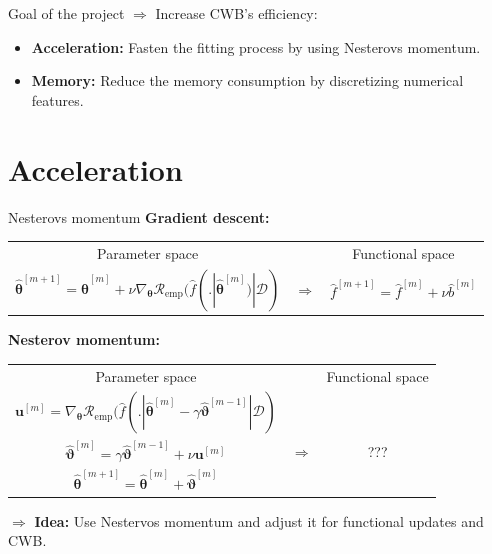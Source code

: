 \documentclass[ignorenonframetext,]{beamer}
\providecommand{\tightlist}{%
  \setlength{\itemsep}{0pt}\setlength{\parskip}{0pt}}
\newcommand{\D}{\mathcal{D}}
\newcommand{\fh}{\hat{f}}
\newcommand{\fmh}{\fh^{[m]}}
\newcommand{\tb}{\bm{\theta}}
\newcommand{\tbh}{\hat{\bm{\theta}}}
\newcommand{\riske}{\mathcal{R}_{\text{emp}}}
\begin{document}
\begin{frame}{Goal of the project}
\protect\hypertarget{goal-of-the-project}{}
\(\Rightarrow\) Increase CWB's efficiency:

\begin{itemize}
\tightlist
\item
  \textbf{Acceleration:} Fasten the fitting process by using Nesterovs
  momentum.
\item
  \textbf{Memory:} Reduce the memory consumption by discretizing
  numerical features.
\end{itemize}
\end{frame}

\hypertarget{acceleration}{%
\section{Acceleration}\label{acceleration}}

\begin{frame}{Nesterovs momentum}
\protect\hypertarget{nesterovs-momentum}{}
\textbf{Gradient descent:}

\vspace{0.2cm}
{\small
\begin{tabular}{ccc}
  Parameter space & & Functional space \\[0.3cm]
  $\tbh^{[m+1]} = \tbh^{[m]} + \nu \nabla_{\tb}\riske(\fh(. | \tbh^{[m]}) | \D)$ & $\Rightarrow$ & $\fh^{[m+1]} = \fmh + \nu \hat{b}^{[m]}$
\end{tabular}}
\vspace{0.2cm}

\textbf{Nesterov momentum:}

\vspace{0.2cm}
{\small
\begin{tabular}{ccc}
  Parameter space & & Functional space \\[0.3cm]
  $\bm{u}^{[m]} = \nabla_{\tb}\riske(\fh(. | \tbh^{[m]} - \gamma \hat{\bm{\vartheta}}^{[m-1]} | \D)$ &  & \\
  $\hat{\bm{\vartheta}}^{[m]} = \gamma \hat{\bm{\vartheta}}^{[m-1]} + \nu \bm{u}^{[m]}$ & $\Rightarrow$ & ??? \\
  $\tbh^{[m+1]} = \tbh^{[m]} + \hat{\bm{\vartheta}}^{[m]}$ & &
\end{tabular}}
\vspace{0.2cm}

\(\Rightarrow\) \textbf{Idea:} Use Nestervos momentum and adjust it for
functional updates and CWB.
\end{frame}
\end{document}
